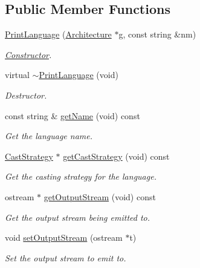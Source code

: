 \subsection*{Public Member Functions}
\begin{DoxyCompactItemize}
\item 
\mbox{\hyperlink{class_print_language_a43e6e04dbeaba98bf571dc089831a2fc}{Print\+Language}} (\mbox{\hyperlink{class_architecture}{Architecture}} $\ast$g, const string \&nm)
\begin{DoxyCompactList}\small\item\em \mbox{\hyperlink{class_constructor}{Constructor}}. \end{DoxyCompactList}\item 
virtual \mbox{\hyperlink{class_print_language_a38c51536214ec4125e43d2eeb0d454cf}{$\sim$\+Print\+Language}} (void)
\begin{DoxyCompactList}\small\item\em Destructor. \end{DoxyCompactList}\item 
const string \& \mbox{\hyperlink{class_print_language_a1818312d92f647fd01a0d38992b1e0c1}{get\+Name}} (void) const
\begin{DoxyCompactList}\small\item\em Get the language name. \end{DoxyCompactList}\item 
\mbox{\hyperlink{class_cast_strategy}{Cast\+Strategy}} $\ast$ \mbox{\hyperlink{class_print_language_a56045dfbcc3c6739918ec60e248574c7}{get\+Cast\+Strategy}} (void) const
\begin{DoxyCompactList}\small\item\em Get the casting strategy for the language. \end{DoxyCompactList}\item 
ostream $\ast$ \mbox{\hyperlink{class_print_language_a6f3c67db2f14e4a8ef13697c28a0a429}{get\+Output\+Stream}} (void) const
\begin{DoxyCompactList}\small\item\em Get the output stream being emitted to. \end{DoxyCompactList}\item 
void \mbox{\hyperlink{class_print_language_ae18d9d88dd9961e1246329051f67df22}{set\+Output\+Stream}} (ostream $\ast$t)
\begin{DoxyCompactList}\small\item\em Set the output stream to emit to. \end{DoxyCompactList}\item 

\end{DoxyCompactItemize}
